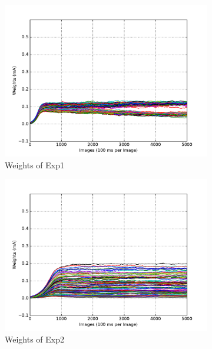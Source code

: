 \begin{figure}
	\centering
	\begin{subfigure}[t]{0.4\textwidth}
		\includegraphics[width=\textwidth]{pics_sdlm/17_exp_SRBM_all_long/exp1_weights_s.pdf}
		\caption{Weights of Exp1}
	\end{subfigure}
	\begin{subfigure}[t]{0.4\textwidth}
		\includegraphics[width=\textwidth]{pics_sdlm/17_exp_SRBM_all_long/exp2_weights_s.pdf}
		\caption{Weights of Exp2}
	\end{subfigure}
	\begin{subfigure}[t]{0.4\textwidth}

\end{subfigure}
\end{figure}
